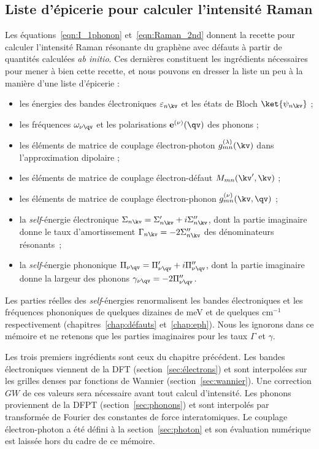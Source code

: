\subsection{Liste d'épicerie pour calculer l'intensité Raman}\label{sec:liste}
Les équations~\eqref{eqn:I_1phonon} et~\eqref{eqn:Raman_2nd} donnent la recette pour calculer l'intensité Raman résonante du graphène avec défauts à partir de quantités calculées \textit{ab initio}. Ces dernières constituent les ingrédients nécessaires pour mener à bien cette recette, et nous pouvons en dresser la liste un peu à la manière d'une liste d'épicerie :
\begin{itemize}
    \item les énergies des bandes électroniques $\varepsilon_{n\kv}$ et les états de Bloch $\ket{\psi_{n\kv}}$ ;
    \item les fréquences $\omega_{\nu\qv}$ et les polarisations $\mathbf{e}^{(\nu)}(\qv)$ des phonons ;
    \item les éléments de matrice de couplage électron-photon $g_{mn}^{(\lambda)}(\kv)$ dans l'approximation dipolaire ;
    \item les éléments de matrice de couplage électron-défaut $M_{mn}(\kv',\kv)$ ;
    \item les éléments de matrice de couplage électron-phonon $g_{mn}^{(\nu)}(\kv,\qv)$ ;
    \item la \textit{self}-énergie électronique $\Sigma_{n\kv}=\Sigma_{n\kv}'+i\Sigma_{n\kv}''$, dont la partie imaginaire donne le taux d'amortissement $\Gamma_{n\kv}=-2\Sigma_{n\kv}''$ des dénominateurs résonants~;
    \item la \textit{self}-énergie phononique $\Pi_{\nu\qv} = \Pi_{\nu\qv}'+i\Pi_{\nu\qv}''$, dont la partie imaginaire donne la largeur des phonons $\gamma_{\nu\qv}=-2\Pi''_{\nu\qv}$.
\end{itemize}

Les parties réelles des \textit{self}-énergies renormalisent les bandes électroniques et les fréquences phononiques de quelques dizaines de meV et de quelques cm$^{-1}$ respectivement (chapitres~\ref{chap:défauts} et~\ref{chap:eph}). Nous les ignorons dans ce mémoire et ne retenons que les parties imaginaires pour les taux $\Gamma$ et $\gamma$.

Les trois premiers ingrédients sont ceux du chapitre précédent. Les bandes électroniques viennent de la DFT (section~\ref{sec:électrons}) et sont interpolées sur les grilles denses par fonctions de Wannier (section~\ref{sec:wannier}). Une correction $GW$ de ces valeurs sera nécessaire avant tout calcul d'intensité. Les phonons proviennent de la DFPT (section~\ref{sec:phonons}) et sont interpolés par transformée de Fourier des constantes de force interatomiques. Le couplage électron-photon a été défini à la section~\ref{sec:photon} et son évaluation numérique est laissée hors du cadre de ce mémoire.


